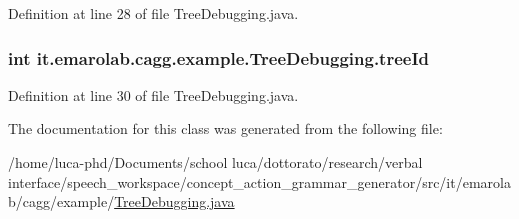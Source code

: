 Definition at line 28 of file Tree\-Debugging.\-java.

\hypertarget{classit_1_1emarolab_1_1cagg_1_1example_1_1TreeDebugging_a659d21489843ad5089694905e946d8ef}{
\subsubsection[{tree\-Id}]{\setlength{\rightskip}{0pt plus 5cm}int it.\-emarolab.\-cagg.\-example.\-Tree\-Debugging.\-tree\-Id\hspace{0.3cm}{\ttfamily [static]}}}\label{classit_1_1emarolab_1_1cagg_1_1example_1_1TreeDebugging_a659d21489843ad5089694905e946d8ef}


Definition at line 30 of file Tree\-Debugging.\-java.



The documentation for this class was generated from the following file\-:\begin{DoxyCompactItemize}
\item 
/home/luca-\/phd/\-Documents/school luca/dottorato/research/verbal interface/speech\-\_\-workspace/concept\-\_\-action\-\_\-grammar\-\_\-generator/src/it/emarolab/cagg/example/\hyperlink{TreeDebugging_8java}{Tree\-Debugging.\-java}\end{DoxyCompactItemize}
